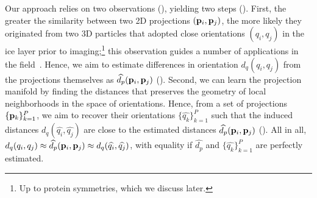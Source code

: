 Our approach relies on two observations (), yielding two steps ().
First, the greater the similarity between two 2D projections $(\mathbf{p}_i, \mathbf{p}_j)$, the more likely they originated from two 3D particles that adopted close orientations $(q_i, q_j)$ in the ice layer prior to imaging;\footnote{Up to protein symmetries, which we discuss later.} this observation guides a number of applications in the field~\cite{frank2006three}.
Hence, we aim to estimate differences in orientation $d_q(q_i, q_j)$ from the projections themselves as $\widehat{d_p}(\mathbf{p}_i, \mathbf{p}_j)$ ().
Second, we can learn the projection manifold by finding the distances that preserves the geometry of local neighborhoods in the space of orientations.
Hence, from a set of projections $\{\mathbf{p}_k\}_{k=1}^P$, we aim to recover their orientations $\{\widehat{q_k}\}_{k=1}^P$ such that the induced distances $d_q(\widehat{q_i}, \widehat{q_j})$ are close to the estimated distances $\widehat{d_p}(\mathbf{p}_i, \mathbf{p}_j)$ ().
All in all, $d_q(q_i, q_j) \approx \widehat{d_p}(\mathbf{p}_i, \mathbf{p}_j) \approx d_q(\widehat{q_i}, \widehat{q_j})$, with equality if $\widehat{d_p}$ and $\{\widehat{q_k}\}_{k=1}^P$ are perfectly estimated.




